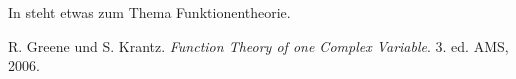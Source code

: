 \documentclass[ngerman]{scrartcl}
\begin{document}
\noindent
In \cite{GreeneKrantz} steht etwas zum Thema Funktionentheorie.

\begin{thebibliography}{GK06} %
 R. Greene und S. Krantz. \textit{Function Theory of one Complex Variable}. 3. ed. AMS, 2006.
\end{thebibliography}
\end{document}
